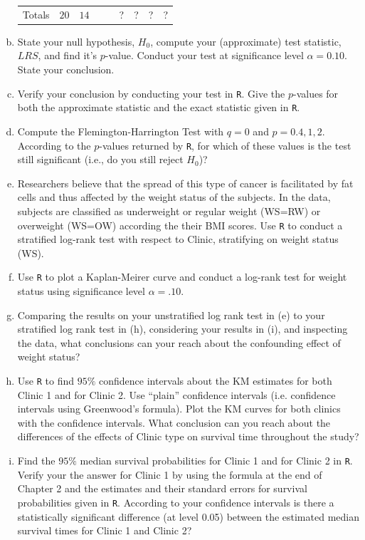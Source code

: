 \documentclass[12pt]{article}
\begin{document}
\begin{enumerate}[(a)]
\begin{center}
\begin{tabular}{ c | c c | c c | c c | c c }
 Totals & $20$ & $14$ & &    & ? & ? & ? & ?
\end{tabular}
\end{center}
\item State your null hypothesis, $H_0$, compute your (approximate) test statistic, $LRS$, and find it's $p$-value. Conduct your test at significance level $\alpha=0.10$. State your conclusion.
\item Verify your conclusion by conducting your test in \lstinline{R}. Give the $p$-values for both the approximate statistic and the exact statistic given in \lstinline{R}.
\item Compute the Flemington-Harrington Test with $q=0$ and $p=0.4, 1, 2$. According to the $p$-values returned by \lstinline{R}, for which of these values is the test still significant (i.e.,  do you still reject $H_0$)?
\item Researchers believe that the spread of this type of cancer is facilitated by fat cells and thus affected by the weight status of the subjects. In the data, subjects are classified as underweight or regular weight (WS=RW) or overweight (WS=OW) according the their BMI scores. Use \lstinline{R} to conduct a stratified log-rank test with respect to Clinic, stratifying on weight status (WS).
\item Use \lstinline{R} to plot a Kaplan-Meirer curve and conduct a log-rank test for weight status using significance level $\alpha=.10$.
\item Comparing the results on your unstratified log rank test in (e) to your stratified log rank test in (h), considering your results in (i), and inspecting the data, what conclusions can your reach about the confounding effect of weight status?
\item Use \lstinline{R} to find $95\%$ confidence intervals about the KM estimates for both Clinic 1 and for Clinic 2. Use ``plain'' confidence intervals (i.e. confidence intervals using Greenwood's formula). Plot the KM curves for both clinics with the confidence intervals. What conclusion can you reach about the differences of the effects of Clinic type on survival time throughout the study?
\item Find the $95\%$ median survival probabilities for Clinic 1 and for Clinic 2 in \lstinline{R}. Verify your the answer for Clinic 1 by using the formula at the end of Chapter 2 and the estimates and their standard errors for survival probabilities given in \lstinline{R}. According to your confidence intervals is there a statistically significant difference (at level 0.05) between the estimated median survival times for Clinic 1 and Clinic 2?
\end{enumerate}
\end{document}
